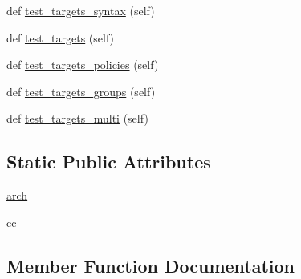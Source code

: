 \begin{DoxyCompactItemize}
\item 
def \hyperlink{classnumpy_1_1distutils_1_1tests_1_1test__ccompiler__opt_1_1__Test__CCompilerOpt_af242a8c808771633d94108ac34576df0}{test\+\_\+targets\+\_\+syntax} (self)
\item 
def \hyperlink{classnumpy_1_1distutils_1_1tests_1_1test__ccompiler__opt_1_1__Test__CCompilerOpt_ad2607124e3b553ab90851e34c8de8e51}{test\+\_\+targets} (self)
\item 
def \hyperlink{classnumpy_1_1distutils_1_1tests_1_1test__ccompiler__opt_1_1__Test__CCompilerOpt_a84c32a57d11e2a408c43d37a17b5c5f4}{test\+\_\+targets\+\_\+policies} (self)
\item 
def \hyperlink{classnumpy_1_1distutils_1_1tests_1_1test__ccompiler__opt_1_1__Test__CCompilerOpt_a6aee3162e8003a66105c04c6ec0bbd67}{test\+\_\+targets\+\_\+groups} (self)
\item 
def \hyperlink{classnumpy_1_1distutils_1_1tests_1_1test__ccompiler__opt_1_1__Test__CCompilerOpt_a2df6dccc049bcd9da003e419231f9de9}{test\+\_\+targets\+\_\+multi} (self)
\end{DoxyCompactItemize}
\subsection*{Static Public Attributes}
\begin{DoxyCompactItemize}
\item 
\hyperlink{classnumpy_1_1distutils_1_1tests_1_1test__ccompiler__opt_1_1__Test__CCompilerOpt_a53896f7260e5ed53aa5d47bd772ae919}{arch}
\item 
\hyperlink{classnumpy_1_1distutils_1_1tests_1_1test__ccompiler__opt_1_1__Test__CCompilerOpt_aac24ca97067e937c2b7dbeec828a67de}{cc}
\end{DoxyCompactItemize}


\subsection{Member Function Documentation}
\mbox{\label{classnumpy_1_1distutils_1_1tests_1_1test__ccompiler__opt_1_1__Test__CCompilerOpt_a59afcf457b4d3ee5fda03357f65d6ae7}} 
